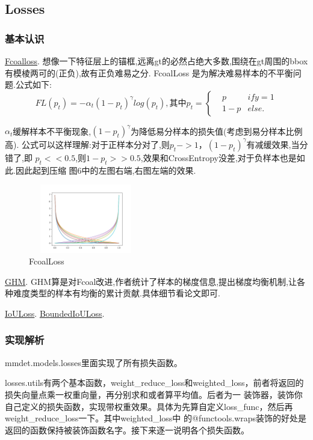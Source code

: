\documentclass[UTF8]{ctexart}
\begin{document}
\subsection{Losses}
\label{sec:loss}
\subsubsection{基本认识}

\href{https://arxiv.org/abs/1708.02002}{Fcoalloss}.
想像一下特征层上的锚框,远离gt的必然占绝大多数,围绕在gt周围的bbox有模棱两可的(正负),故有正负难易之分.
FcoalLoss 是为解决难易样本的不平衡问题.公式如下:
\begin{equation}
	FL(p_t) = -\alpha_{t}(1-p_t)^{\gamma}log(p_t),\text{其中}
	p_t=\left\{
	\begin{aligned}
	&p & if y =1\\
	&1-p & else.
	\end{aligned}
	\right.
\end{equation}

$\alpha_t$缓解样本不平衡现象,$(1-p_t)^{\gamma}$为降低易分样本的损失值(考虑到易分样本比例高).
公式可以这样理解:对于正样本分对了,则$p_t->1$，$(1-p_t)^{\gamma}$有减缓效果,当分错了,即
$p_t << 0.5$,则$1-p_t >>0.5$,效果和CrossEntropy没差,对于负样本也是如此.因此起到压缩
图6中的左图右端,右图左端的效果.

\begin{figure}[htbp]
	\centering
	\includegraphics[width=5cm,height=3cm]{./pic/Focal_01.png}
	\caption{FcoalLoss}
\end{figure}

\href{https://arxiv.org/abs/1811.05181}{GHM}.
GHM算是对Fcoal改进,作者统计了样本的梯度信息,提出梯度均衡机制,让各种难度类型的样本有均衡的累计贡献.具体细节看论文即可.

\href{https://arxiv.org/abs/1908.03851}{IoULoss}.
\href{https://arxiv.org/abs/1711.00164}{BoundedIoULoss}.

\subsubsection{实现解析}
mmdet.models.losses里面实现了所有损失函数。

losses.utils有两个基本函数，weight\_reduce\_loss和weighted\_loss，前者将返回的损失向量点乘一权重向量，再分别求和或者算平均值。后者为一
装饰器，装饰你自己定义的损失函数，实现带权重效果。具体为先算自定义loss\_func，然后再weight\_reduce\_loss一下。其中weighted\_loss中
的@functools.wraps装饰的好处是返回的函数保持被装饰函数名字。接下来逐一说明各个损失函数。
\end{document}
